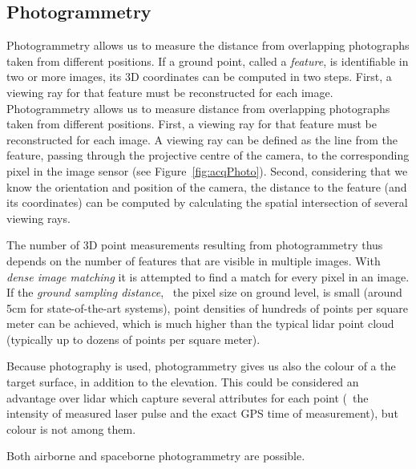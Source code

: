 \subsection{Photogrammetry}
Photogrammetry allows us to measure the distance from overlapping photographs taken from different positions. 
If a ground point, called a \emph{feature}, is identifiable in two or more images, its 3D coordinates can be computed in two steps. 
First, a viewing ray for that feature must be reconstructed for each image. 
Photogrammetry allows us to measure distance from overlapping photographs taken from different positions. 
First, a viewing ray for that feature must be reconstructed for each image. 
A viewing ray can be defined as the line from the feature, passing through the projective centre of the camera, to the corresponding pixel in the image sensor (see Figure~\ref{fig:acqPhoto}). 
Second, considering that we know the orientation and position of the camera, the distance to the feature (and its coordinates) can be computed by calculating the spatial intersection of several viewing rays.


The number of 3D point measurements resulting from photogrammetry thus depends on the number of features that are visible in multiple images.
With \emph{dense image matching} it is attempted to find a match for every pixel in an image. 
If the \emph{ground sampling distance}, \ie\ the pixel size on ground level, is small (around 5cm for state-of-the-art systems), point densities of hundreds of points per square meter can be achieved, which is much higher than the typical lidar point cloud (typically up to dozens of points per square meter). 

Because photography is used, photogrammetry gives us also the colour of a the target surface, in addition to the elevation.
This could be considered an advantage over lidar which capture several attributes for each point (\eg\ the intensity of measured laser pulse and the exact GPS time of measurement), but colour is not among them.

Both airborne and spaceborne photogrammetry are possible.

